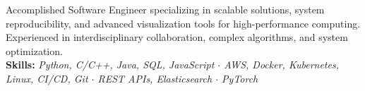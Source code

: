 \documentclass{resume} %
\begin{document}
\singlespacing



\renewcommand{\sectionlineskip}{\vspace{-0.8em}}
\begin{rSection}{}
Accomplished Software Engineer specializing in scalable solutions, system reproducibility, and advanced visualization tools for high-performance computing. Experienced in interdisciplinary collaboration, complex algorithms, and system optimization.\\
\textbf{Skills:} \textit{Python, C/C++, Java, SQL, JavaScript $\cdot$ AWS, Docker, Kubernetes, Linux, CI/CD, Git $\cdot$ REST APIs, Elasticsearch $\cdot$ PyTorch}
\end{rSection}
\renewcommand{\sectionlineskip}{\medskip}

\end{document}
